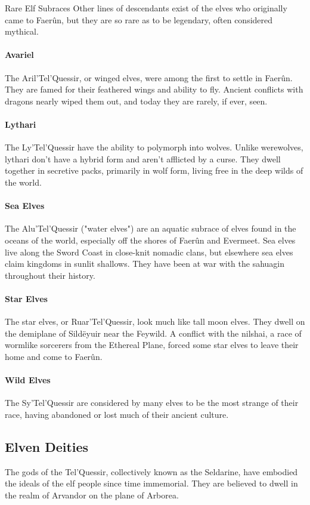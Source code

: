 \documentclass[10pt,a4paper,twoside,twocolumn,openany,bg=print,nodeprecatedcode]{dndbook}
\begin{document}
\begin{DndComment}{Rare Elf Subraces}
Other lines of descendants exist of the elves who originally came to Faerûn, but they are so rare as to be legendary, often considered mythical.
\paragraph{Avariel}
The Aril'Tel'Quessir, or winged elves, were among the first to settle in Faerûn. They are famed for their feathered wings and ability to fly. Ancient conflicts with dragons nearly wiped them out, and today they are rarely, if ever, seen.
\paragraph{Lythari}
The Ly'Tel'Quessir have the ability to polymorph into wolves. Unlike werewolves, lythari don't have a hybrid form and aren't afflicted by a curse. They dwell together in secretive packs, primarily in wolf form, living free in the deep wilds of the world.
\paragraph{Sea Elves}
The Alu'Tel'Quessir ("water elves") are an aquatic subrace of elves found in the oceans of the world, especially off the shores of Faerûn and Evermeet. Sea elves live along the Sword Coast in close-knit nomadic clans, but elsewhere sea elves claim kingdoms in sunlit shallows. They have been at war with the sahuagin throughout their history.
\paragraph{Star Elves}
The star elves, or Ruar'Tel'Quessir, look much like tall moon elves. They dwell on the demiplane of Sildëyuir near the Feywild. A conflict with the nilshai, a race of wormlike sorcerers from the Ethereal Plane, forced some star elves to leave their home and come to Faerûn.
\paragraph{Wild Elves}
The Sy'Tel'Quessir are considered by many elves to be the most strange of their race, having abandoned or lost much of their ancient culture.
\end{DndComment}

\subsection{Elven Deities}
The gods of the Tel'Quessir, collectively known as the Seldarine, have embodied the ideals of the elf people since time immemorial. They are believed to dwell in the realm of Arvandor on the plane of Arborea.
\end{document}
